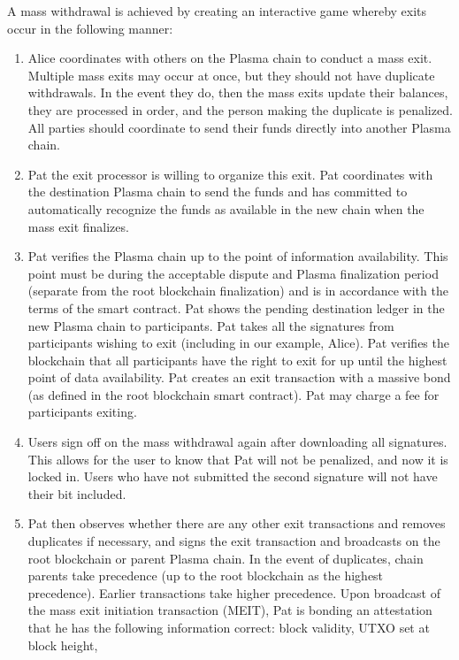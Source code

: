 \documentclass[letterpaper, 11pt]{article}
\begin{document}
A mass withdrawal is achieved by creating an interactive game whereby exits
occur in the following manner:
\begin{enumerate}
	\item
		Alice coordinates with others on the Plasma chain to conduct a
		mass exit. Multiple mass exits may occur at once, but they
		should not have duplicate withdrawals. In the event they do,
		then the mass exits update their balances, they are processed
		in order, and the person making the duplicate is penalized. All
		parties should coordinate to send their funds directly into
		another Plasma chain.
	\item
		Pat the exit processor is willing to organize this exit. Pat
		coordinates with the destination Plasma chain to send the funds
		and has committed to automatically recognize the funds as
		available in the new chain when the mass exit finalizes.
	\item
		Pat verifies the Plasma chain up to the point of information
		availability. This point must be during the acceptable dispute
		and Plasma finalization period (separate from the root
		blockchain finalization) and is in accordance with the terms of
		the smart contract. Pat shows the pending destination ledger in
		the new Plasma chain to participants. Pat takes all the
		signatures from participants wishing to exit (including in our
		example, Alice). Pat verifies the blockchain that all
		participants have the right to exit for up until the highest
		point of data availability. Pat creates an exit transaction
		with a massive bond (as defined in the root blockchain smart
		contract). Pat may charge a fee for participants exiting.
	\item
		Users sign off on the mass withdrawal again after downloading
		all signatures. This allows for the user to know that Pat will
		not be penalized, and now it is locked in. Users who have not
		submitted the second signature will not have their bit included.
	\item
		Pat then observes whether there are any other exit transactions
		and removes duplicates if necessary, and signs the exit
		transaction and broadcasts on the root blockchain or parent
		Plasma chain. In the event of duplicates, chain parents take
		precedence (up to the root blockchain as the highest
		precedence). Earlier transactions take higher precedence. Upon
		broadcast of the mass exit initiation transaction (MEIT), Pat is
		bonding an attestation that he has the following information
		correct: block validity, UTXO set at block height,

\end{enumerate}
\end{document}
